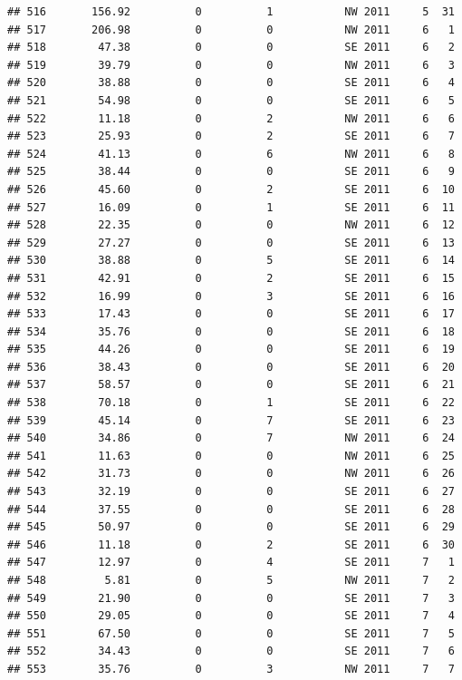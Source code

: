 \documentclass[
]{article}
\begin{document}
\begin{verbatim}
## 516       156.92          0          1           NW 2011     5  31
## 517       206.98          0          0           NW 2011     6   1
## 518        47.38          0          0           SE 2011     6   2
## 519        39.79          0          0           NW 2011     6   3
## 520        38.88          0          0           SE 2011     6   4
## 521        54.98          0          0           SE 2011     6   5
## 522        11.18          0          2           NW 2011     6   6
## 523        25.93          0          2           SE 2011     6   7
## 524        41.13          0          6           NW 2011     6   8
## 525        38.44          0          0           SE 2011     6   9
## 526        45.60          0          2           SE 2011     6  10
## 527        16.09          0          1           SE 2011     6  11
## 528        22.35          0          0           NW 2011     6  12
## 529        27.27          0          0           SE 2011     6  13
## 530        38.88          0          5           SE 2011     6  14
## 531        42.91          0          2           SE 2011     6  15
## 532        16.99          0          3           SE 2011     6  16
## 533        17.43          0          0           SE 2011     6  17
## 534        35.76          0          0           SE 2011     6  18
## 535        44.26          0          0           SE 2011     6  19
## 536        38.43          0          0           SE 2011     6  20
## 537        58.57          0          0           SE 2011     6  21
## 538        70.18          0          1           SE 2011     6  22
## 539        45.14          0          7           SE 2011     6  23
## 540        34.86          0          7           NW 2011     6  24
## 541        11.63          0          0           NW 2011     6  25
## 542        31.73          0          0           NW 2011     6  26
## 543        32.19          0          0           SE 2011     6  27
## 544        37.55          0          0           SE 2011     6  28
## 545        50.97          0          0           SE 2011     6  29
## 546        11.18          0          2           SE 2011     6  30
## 547        12.97          0          4           SE 2011     7   1
## 548         5.81          0          5           NW 2011     7   2
## 549        21.90          0          0           SE 2011     7   3
## 550        29.05          0          0           SE 2011     7   4
## 551        67.50          0          0           SE 2011     7   5
## 552        34.43          0          0           SE 2011     7   6
## 553        35.76          0          3           NW 2011     7   7

\end{verbatim}
\end{document}

